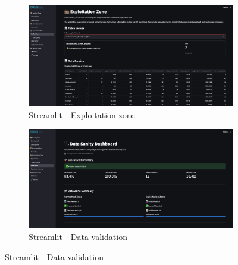 \begin{figure}[H]
    \begin{subfigure}[b]{0.45\textwidth}
        \includegraphics[width=\linewidth]{latex/imgs/app/exploitation_zone.png}
        \caption{Streamlit - Exploitation zone}
        \label{fig:exploitation-zone}
    \end{subfigure}
    \hfill
    \begin{subfigure}[b]{0.45\textwidth}
        \includegraphics[width=\linewidth]{latex/imgs/app/data_sanity_dashboard.png}
        \caption{Streamlit - Data validation}
        \label{fig:data-validation}
    \end{subfigure}
    

\end{figure}
